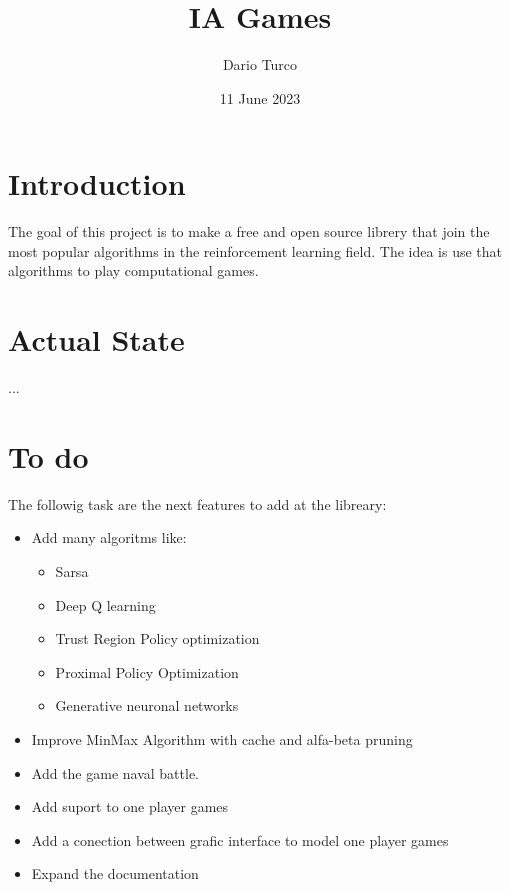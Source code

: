 \documentclass{article}
\title{IA Games}
\author{Dario Turco}
\date{11 June 2023}
\begin{document}
\maketitle

\section{Introduction}

The goal of this project is to make a free and open source librery that join the most popular algorithms in the reinforcement learning field. The idea is use that algorithms to play computational games.

\section{Actual State}

...

\section{To do}

The followig task are the next features to add at the libreary:

\begin{itemize}
    \item Add many algoritms like:
    \begin{itemize}
        \item Sarsa
        \item Deep Q learning
        \item Trust Region Policy optimization
        \item Proximal Policy Optimization
        \item Generative neuronal networks
    \end{itemize}    

    \item Improve MinMax Algorithm with cache and alfa-beta pruning
    \item Add the game naval battle.
    \item Add suport to one player games
    \item Add a conection between grafic interface to model one player games
    \item Expand the documentation
\end{itemize}
\end{document}
